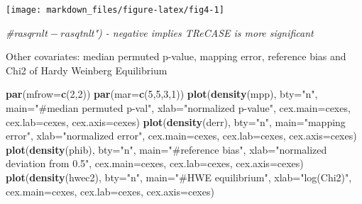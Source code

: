 \documentclass[]{article}
\newenvironment{Shaded}{\begin{snugshade}}{\end{snugshade}}
\newcommand{\KeywordTok}[1]{\textcolor[rgb]{0.13,0.29,0.53}{\textbf{#1}}}
\newcommand{\DataTypeTok}[1]{\textcolor[rgb]{0.13,0.29,0.53}{#1}}
\newcommand{\DecValTok}[1]{\textcolor[rgb]{0.00,0.00,0.81}{#1}}
\newcommand{\StringTok}[1]{\textcolor[rgb]{0.31,0.60,0.02}{#1}}
\newcommand{\CommentTok}[1]{\textcolor[rgb]{0.56,0.35,0.01}{\textit{#1}}}
\newcommand{\NormalTok}[1]{#1}
\begin{document}
\begin{center}\texttt{[image: markdown\_files/figure-latex/fig4-1]} \end{center}

\begin{Shaded}
\begin{Highlighting}[]
\CommentTok{#rasq$rnlt-rasq$tnlt") - negative implies TReCASE is more significant}
\end{Highlighting}
\end{Shaded}

Other covariates: median permuted p-value, mapping error, reference bias
and Chi2 of Hardy Weinberg Equilibrium

\begin{Shaded}
\begin{Highlighting}[]
\KeywordTok{par}\NormalTok{(}\DataTypeTok{mfrow=}\KeywordTok{c}\NormalTok{(}\DecValTok{2}\NormalTok{,}\DecValTok{2}\NormalTok{))}
\KeywordTok{par}\NormalTok{(}\DataTypeTok{mar=}\KeywordTok{c}\NormalTok{(}\DecValTok{5}\NormalTok{,}\DecValTok{5}\NormalTok{,}\DecValTok{3}\NormalTok{,}\DecValTok{1}\NormalTok{))}
\KeywordTok{plot}\NormalTok{(}\KeywordTok{density}\NormalTok{(mpp), }\DataTypeTok{bty=}\StringTok{"n"}\NormalTok{, }\DataTypeTok{main=}\StringTok{"#median permuted p-val"}\NormalTok{, }
     \DataTypeTok{xlab=}\StringTok{"normalized p-value"}\NormalTok{, }\DataTypeTok{cex.main=}\NormalTok{cexes, }\DataTypeTok{cex.lab=}\NormalTok{cexes, }\DataTypeTok{cex.axis=}\NormalTok{cexes)}
\KeywordTok{plot}\NormalTok{(}\KeywordTok{density}\NormalTok{(derr), }\DataTypeTok{bty=}\StringTok{"n"}\NormalTok{, }\DataTypeTok{main=}\StringTok{"mapping error"}\NormalTok{, }
     \DataTypeTok{xlab=}\StringTok{"normalized error"}\NormalTok{, }\DataTypeTok{cex.main=}\NormalTok{cexes, }\DataTypeTok{cex.lab=}\NormalTok{cexes, }\DataTypeTok{cex.axis=}\NormalTok{cexes)}
\KeywordTok{plot}\NormalTok{(}\KeywordTok{density}\NormalTok{(phib), }\DataTypeTok{bty=}\StringTok{"n"}\NormalTok{, }\DataTypeTok{main=}\StringTok{"#reference bias"}\NormalTok{, }
     \DataTypeTok{xlab=}\StringTok{"normalized deviation from 0.5"}\NormalTok{, }\DataTypeTok{cex.main=}\NormalTok{cexes, }\DataTypeTok{cex.lab=}\NormalTok{cexes, }\DataTypeTok{cex.axis=}\NormalTok{cexes)}
\KeywordTok{plot}\NormalTok{(}\KeywordTok{density}\NormalTok{(hwec2), }\DataTypeTok{bty=}\StringTok{"n"}\NormalTok{, }\DataTypeTok{main=}\StringTok{"#HWE equilibrium"}\NormalTok{, }
     \DataTypeTok{xlab=}\StringTok{"log(Chi2)"}\NormalTok{, }\DataTypeTok{cex.main=}\NormalTok{cexes, }\DataTypeTok{cex.lab=}\NormalTok{cexes, }\DataTypeTok{cex.axis=}\NormalTok{cexes)}
\end{Highlighting}
\end{Shaded}
\end{document}
